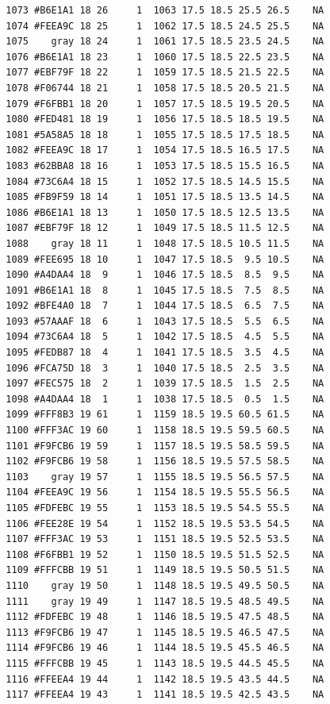 \documentclass[12pt,twoside]{reedthesis}
\begin{document}
\begin{verbatim}
  1073 #B6E1A1 18 26     1  1063 17.5 18.5 25.5 26.5    NA
  1074 #FEEA9C 18 25     1  1062 17.5 18.5 24.5 25.5    NA
  1075    gray 18 24     1  1061 17.5 18.5 23.5 24.5    NA
  1076 #B6E1A1 18 23     1  1060 17.5 18.5 22.5 23.5    NA
  1077 #EBF79F 18 22     1  1059 17.5 18.5 21.5 22.5    NA
  1078 #F06744 18 21     1  1058 17.5 18.5 20.5 21.5    NA
  1079 #F6FBB1 18 20     1  1057 17.5 18.5 19.5 20.5    NA
  1080 #FED481 18 19     1  1056 17.5 18.5 18.5 19.5    NA
  1081 #5A58A5 18 18     1  1055 17.5 18.5 17.5 18.5    NA
  1082 #FEEA9C 18 17     1  1054 17.5 18.5 16.5 17.5    NA
  1083 #62BBA8 18 16     1  1053 17.5 18.5 15.5 16.5    NA
  1084 #73C6A4 18 15     1  1052 17.5 18.5 14.5 15.5    NA
  1085 #FB9F59 18 14     1  1051 17.5 18.5 13.5 14.5    NA
  1086 #B6E1A1 18 13     1  1050 17.5 18.5 12.5 13.5    NA
  1087 #EBF79F 18 12     1  1049 17.5 18.5 11.5 12.5    NA
  1088    gray 18 11     1  1048 17.5 18.5 10.5 11.5    NA
  1089 #FEE695 18 10     1  1047 17.5 18.5  9.5 10.5    NA
  1090 #A4DAA4 18  9     1  1046 17.5 18.5  8.5  9.5    NA
  1091 #B6E1A1 18  8     1  1045 17.5 18.5  7.5  8.5    NA
  1092 #BFE4A0 18  7     1  1044 17.5 18.5  6.5  7.5    NA
  1093 #57AAAF 18  6     1  1043 17.5 18.5  5.5  6.5    NA
  1094 #73C6A4 18  5     1  1042 17.5 18.5  4.5  5.5    NA
  1095 #FEDB87 18  4     1  1041 17.5 18.5  3.5  4.5    NA
  1096 #FCA75D 18  3     1  1040 17.5 18.5  2.5  3.5    NA
  1097 #FEC575 18  2     1  1039 17.5 18.5  1.5  2.5    NA
  1098 #A4DAA4 18  1     1  1038 17.5 18.5  0.5  1.5    NA
  1099 #FFF8B3 19 61     1  1159 18.5 19.5 60.5 61.5    NA
  1100 #FFF3AC 19 60     1  1158 18.5 19.5 59.5 60.5    NA
  1101 #F9FCB6 19 59     1  1157 18.5 19.5 58.5 59.5    NA
  1102 #F9FCB6 19 58     1  1156 18.5 19.5 57.5 58.5    NA
  1103    gray 19 57     1  1155 18.5 19.5 56.5 57.5    NA
  1104 #FEEA9C 19 56     1  1154 18.5 19.5 55.5 56.5    NA
  1105 #FDFEBC 19 55     1  1153 18.5 19.5 54.5 55.5    NA
  1106 #FEE28E 19 54     1  1152 18.5 19.5 53.5 54.5    NA
  1107 #FFF3AC 19 53     1  1151 18.5 19.5 52.5 53.5    NA
  1108 #F6FBB1 19 52     1  1150 18.5 19.5 51.5 52.5    NA
  1109 #FFFCBB 19 51     1  1149 18.5 19.5 50.5 51.5    NA
  1110    gray 19 50     1  1148 18.5 19.5 49.5 50.5    NA
  1111    gray 19 49     1  1147 18.5 19.5 48.5 49.5    NA
  1112 #FDFEBC 19 48     1  1146 18.5 19.5 47.5 48.5    NA
  1113 #F9FCB6 19 47     1  1145 18.5 19.5 46.5 47.5    NA
  1114 #F9FCB6 19 46     1  1144 18.5 19.5 45.5 46.5    NA
  1115 #FFFCBB 19 45     1  1143 18.5 19.5 44.5 45.5    NA
  1116 #FFEEA4 19 44     1  1142 18.5 19.5 43.5 44.5    NA
  1117 #FFEEA4 19 43     1  1141 18.5 19.5 42.5 43.5    NA

\end{verbatim}
\end{document}
